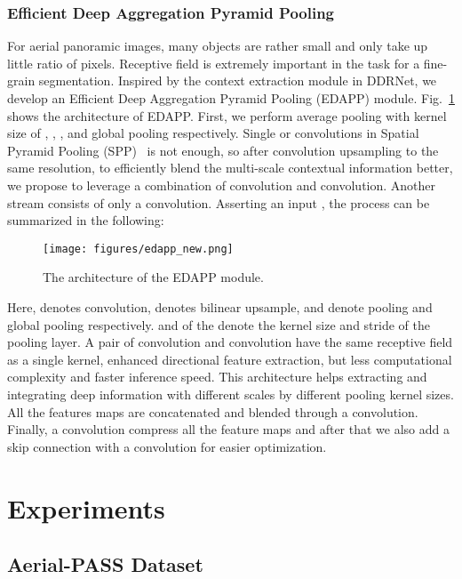 \documentclass[letterpaper, 10 pt, conference]{ieeeconf}
\begin{document}
\subsubsection{Efficient Deep Aggregation Pyramid Pooling}
For aerial panoramic images, many objects are rather small and only take up little ratio of pixels. Receptive field is extremely important in the task for a fine-grain segmentation.
Inspired by the context extraction module in DDRNet\cite{ddrnet}, we develop an Efficient Deep Aggregation Pyramid Pooling (EDAPP) module.
Fig.~\ref{fig:edapp} shows the architecture of EDAPP.
First, we perform average pooling with kernel size of , , , and global pooling respectively.
Single  or  convolutions in Spatial Pyramid Pooling (SPP)~\cite{SPP} is not enough, so after  convolution upsampling to the same resolution, to efficiently blend the multi-scale contextual information better, we propose to leverage a combination of  convolution and  convolution. Another stream consists of only a  convolution. Asserting an input , the process can be summarized in the following:



\begin{figure}[!t]
    \centerline{\texttt{[image: figures/edapp\_new.png]}}
    \caption{The architecture of the EDAPP module.}
    \label{fig:edapp}
\end{figure}

Here,  denotes convolution,  denotes bilinear upsample,  and  denote pooling and global pooling respectively.
 and  of the  denote the kernel size and stride of the pooling layer. 
A pair of  convolution and  convolution have the same receptive field as a single  kernel, enhanced directional feature extraction, but less computational complexity and faster inference speed.
This architecture helps extracting and integrating deep information with different scales by different pooling kernel sizes. All the features maps are concatenated and blended through a  convolution. Finally, a  convolution compress all the feature maps and after that we also add a skip connection with a  convolution for easier optimization.

\section{Experiments}

\subsection{Aerial-PASS Dataset}
\end{document}
